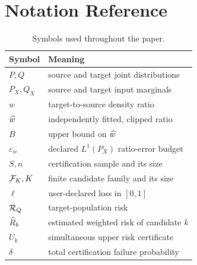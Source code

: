 \section{Notation Reference}
\label{app:notation}

\begin{table}[h]
\centering
\caption{Symbols used throughout the paper.}
\small
\setlength{\tabcolsep}{4pt}
\begin{tabular}{ll}
\toprule
Symbol & Meaning \\
\midrule
$P,Q$ & source and target joint distributions \\
$P_X,Q_X$ & source and target input marginals \\
$w$ & target-to-source density ratio \\
$\widehat w$ & independently fitted, clipped ratio \\
$B$ & upper bound on $\widehat w$ \\
$\varepsilon_w$ & declared $L^1(P_X)$ ratio-error budget \\
$S,n$ & certification sample and its size \\
$\mathcal{F}_K,K$ & finite candidate family and its size \\
$\ell$ & user-declared loss in $[0,1]$ \\
$\mathcal{R}_Q$ & target-population risk \\
$\widehat R_k$ & estimated weighted risk of candidate $k$ \\
$U_k$ & simultaneous upper risk certificate \\
$\delta$ & total certification failure probability \\
\bottomrule
\end{tabular}
\end{table}
